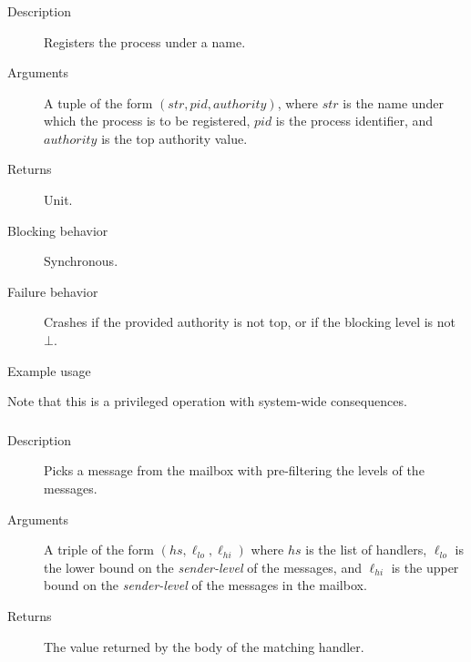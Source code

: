 \subsubsection{}
\begin{description}
    \item [Description] Registers the process under a name.
    \item [Arguments] A tuple of the form $(\mathit{str}, \mathit{pid}, \mathit{authority})$, where $\mathit{str}$ is the name under
which the process is to be registered, $\mathit{pid}$ is the process identifier, and 
$\mathit{authority}$ is the top authority value.
    \item [Returns] Unit.
    \item [Blocking behavior] Synchronous. 
    \item [Failure behavior] Crashes if the provided authority is not top, or if the blocking level is not $\bot$.
    \item [Example usage]
\end{description}

Note that this is a privileged operation with system-wide consequences. 


\subsubsection{}
\begin{description}
    \item [Description] Picks a message from the mailbox with pre-filtering the levels of the messages.
    \item [Arguments] A triple of the form $(\mathit{hs}, \ell_{\mathit{lo}}, \ell_{\mathit{hi}}) $ where $\mathit{hs}$ is the list of handlers, $\ell_{\mathit{lo}}$ is the lower bound on the \emph{sender-level} of the messages, and 
$\ell_{\mathit{hi}}$ is the upper bound on the \emph{sender-level} of the messages in the mailbox.
    \item [Returns] The value returned by the body of the matching handler.
\end{description}

\subsubsection{}

